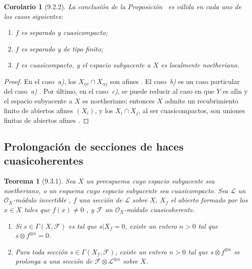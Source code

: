 \documentclass[oneside]{amsart}
\theoremstyle{ega-env-style}
\theoremstyle{ega-thm-env-style}
\newtheorem*{theorem}{Teorema}
\newtheorem*{corollary}{Corolario}
\theoremstyle{ega-defn-env-style}
\let\EGAOriginalLabel\label
\renewcommand{\label}[1]{\phantomsection\EGAOriginalLabel{#1}}
\begin{document}
\begin{corollary}[9.2.2]
\label{I.9.2.2}
La conclusión de la Proposición~ es válida en cada uno de los casos siguientes:
\begin{enumerate}
  \item[\textup{a)}] $f$ es separado y cuasicompacto;
  \item[\textup{b)}] $f$ es separado y de tipo finito;
  \item[\textup{c)}] $f$ es cuasicompacto, y el espacio subyacente a $X$ es localmente noetheriano.
\end{enumerate}
\end{corollary}

\begin{proof}
En el caso~\emph{a)}, los $X_{\alpha i}\cap X_{\alpha j}$ son afines .
El caso~\emph{b)} es un caso particular del caso~\emph{a)} . Por último, en el caso~\emph{c)}, se puede reducir al caso en que $Y$ es afín y el espacio subyacente a $X$ es noetheriano; entonces $X$ admite un recubrimiento finito de abiertos afines $(X_i)$, y los $X_i\cap X_j$, al ser cuasicompactos, son uniones finitas de abiertos afines .
\end{proof}

\subsection{Prolongación de secciones de haces cuasicoherentes}
\label{subsection:I.9.3}

\begin{theorem}[9.3.1]
\label{I.9.3.1}
Sea $X$ un preesquema cuyo espacio subyacente sea noetheriano, o un esquema cuyo espacio
subyacente sea cuasicompacto. Sea $\mathscr{L}$ un $\mathscr{O}_X$-módulo invertible , $f$ una
sección de $\mathscr{L}$ sobre $X$, $X_f$ el abierto formado por los $x\in X$ tales que $f(x)\neq0$
, y $\mathscr{F}$ un $\mathscr{O}_X$-módulo cuasicoherente.
\begin{enumerate}
  \item[{\rm(i)}] Si $s\in\Gamma(X,\mathscr{F})$ es tal que $s|X_f=0$, existe un entero $n>0$ tal que $s\otimes f^{\otimes n}=0$.
  \item[{\rm(ii)}] Para toda sección $s\in\Gamma(X_f,\mathscr{F})$, existe un entero $n>0$ tal que $s\otimes f^{\otimes n}$ se prolonga a una sección de $\mathscr{F}\otimes\mathscr{L}^{\otimes n}$ sobre $X$.
\end{enumerate}
\end{theorem}
\end{document}
